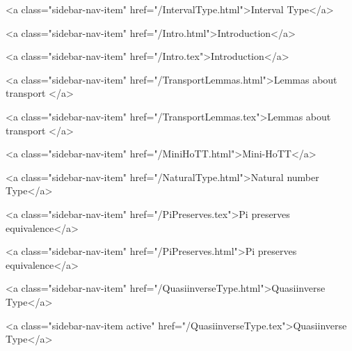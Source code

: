       
    
      
        
          <a class="sidebar-nav-item" href="/IntervalType.html">Interval Type</a>
        
      
    
      
        
          <a class="sidebar-nav-item" href="/Intro.html">Introduction</a>
        
      
    
      
        
          <a class="sidebar-nav-item" href="/Intro.tex">Introduction</a>
        
      
    
      
        
          <a class="sidebar-nav-item" href="/TransportLemmas.html">Lemmas about transport </a>
        
      
    
      
        
          <a class="sidebar-nav-item" href="/TransportLemmas.tex">Lemmas about transport </a>
        
      
    
      
        
          <a class="sidebar-nav-item" href="/MiniHoTT.html">Mini-HoTT</a>
        
      
    
      
        
          <a class="sidebar-nav-item" href="/NaturalType.html">Natural number Type</a>
        
      
    
      
        
          <a class="sidebar-nav-item" href="/PiPreserves.tex">Pi preserves equivalence</a>
        
      
    
      
        
          <a class="sidebar-nav-item" href="/PiPreserves.html">Pi preserves equivalence</a>
        
      
    
      
        
          <a class="sidebar-nav-item" href="/QuasiinverseType.html">Quasiinverse Type</a>
        
      
    
      
        
          <a class="sidebar-nav-item active" href="/QuasiinverseType.tex">Quasiinverse Type</a>
        
